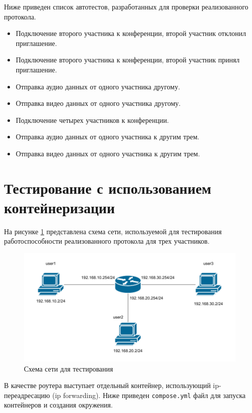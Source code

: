 Ниже приведен список автотестов, разработанных для проверки реализованного протокола. 

\begin{itemize}[label=---]
  \item Подключение второго участника к конференции, второй участник отклонил приглашение.
  \item Подключение второго участника к конференции, второй участник принял приглашение.
  \item Отправка аудио данных от одного участника другому.
  \item Отправка видео данных от одного участника другому.
  \item Подключение четырех участников к конференции.
  \item Отправка аудио данных от одного участника к другим трем.
  \item Отправка видео данных от одного участника к другим трем.
\end{itemize}

\section{Тестирование с использованием контейнеризации}

На рисунке \ref{img:testing-docker} представлена схема сети, используемой для тестирования работоспособности реализованного протокола для трех участников.

\begin{figure}[H]
  \centering
  \includegraphics{inc/diag/testing-docker.pdf}
  \caption{Схема сети для тестирования}
  \label{img:testing-docker}
\end{figure}

В качестве роутера выступает отдельный контейнер, использующий ip-переадресацию (ip forwarding).
Ниже приведен \texttt{compose.yml} файл для запуска контейнеров и создания окружения.


